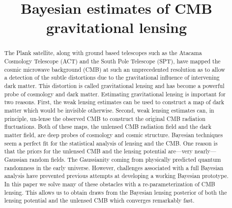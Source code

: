 \documentclass[noinfoline]{imsart}
\begin{document}
\begin{frontmatter}
\title{Bayesian estimates of CMB gravitational lensing}

\begin{abstract} 
The Plank satellite, along with ground based telescopes such as the Atacama Cosmology Telescope (ACT)  and  the South Pole Telescope (SPT), have mapped the  cosmic microwave background (CMB) at such an unprecedented resolution as to allow a detection of the subtle distortions  due to the gravitational influence of intervening  dark matter. This distortion is called  gravitational lensing and has become a  powerful probe of cosmology and dark matter. Estimating gravitational lensing  is important for two reasons. First, the weak lensing estimates can be used to construct a map of dark matter which would be invisible otherwise. Second,  weak lensing estimates can, in principle, un-lense the observed CMB to construct the original CMB radiation fluctuations. Both of these maps,  the unlensed CMB radiation field and the dark matter field, are deep probes of cosmology and cosmic structure. Bayesian techniques seem a perfect fit for the statistical analysis of lensing and the CMB. One reason is that the priors for the unlensed CMB and the lensing potential are---very nearly---Gaussian random fields. The Gaussianity coming from physically predicted  quantum randomness in the early universe. However, challenges associated with a full Bayesian analysis have prevented previous attempts at  developing a working Bayesian prototype. 
In this paper we solve many of these obstacles with a re-parameterization of CMB lensing. This  allows us to obtain draws from the  Bayesian lensing posterior of both the lensing potential and the unlensed CMB which converges remarkably fast. 
\end{abstract}

\begin{keyword}
\end{keyword}

\end{frontmatter}
\end{document}

